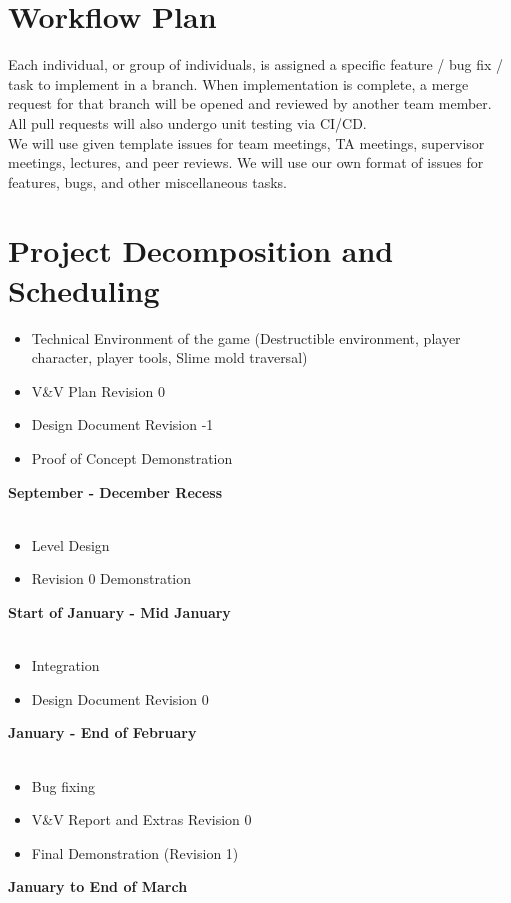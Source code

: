 \documentclass{article}
\begin{document}
\section{Workflow Plan}

Each individual, or group of individuals, is assigned a specific feature / bug fix / task to implement in a branch. When implementation is complete, a merge request for that branch will be opened and reviewed by another team member. All pull requests will also undergo unit testing via CI/CD.\\

We will use given template issues for team meetings, TA meetings, supervisor meetings, lectures, and peer reviews. We will use our own format of issues for features, bugs, and other miscellaneous tasks.


\section{Project Decomposition and Scheduling}

\begin{itemize}
\item{Technical Environment of the game (Destructible environment, player character, player tools, Slime mold traversal)}
\item{V\&V Plan Revision 0}
\item{Design Document Revision -1}
\item{Proof of Concept Demonstration}
\end{itemize}
\textbf{September - December Recess}
\\
\\
\begin{itemize}
\item{Level Design}
\item{Revision 0 Demonstration}
\end{itemize}
\textbf{Start of January - Mid January}
\\
\\
\begin{itemize}
\item{Integration}
\item{Design Document Revision 0}
\end{itemize}
\textbf{January - End of February}
\\
\\
\begin{itemize}
\item{Bug fixing}
\item{V\&V Report and Extras Revision 0}
\item{Final Demonstration (Revision 1)}
\end{itemize}
\textbf{January to End of March}\\
\end{document}
